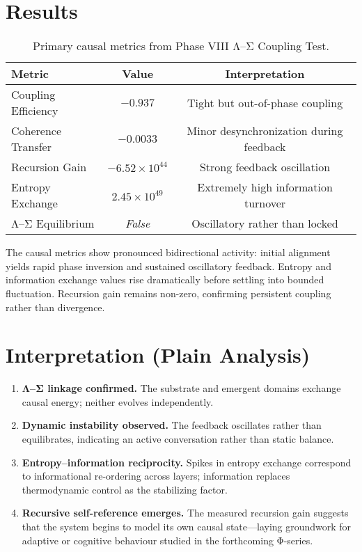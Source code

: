 \documentclass[11pt,a4paper]{article}
\begin{document}
\section{Results}
\begin{table}[h!]
\centering
\begin{tabular}{@{}lcc@{}}
\toprule
\textbf{Metric} & \textbf{Value} & \textbf{Interpretation}\\
\midrule
Coupling Efficiency & $-0.937$ & Tight but out-of-phase coupling\\
Coherence Transfer & $-0.0033$ & Minor desynchronization during feedback\\
Recursion Gain & $-6.52\times10^{44}$ & Strong feedback oscillation\\
Entropy Exchange & $2.45\times10^{49}$ & Extremely high information turnover\\
Λ–Σ Equilibrium & \textit{False} & Oscillatory rather than locked\\
\bottomrule
\end{tabular}
\caption{Primary causal metrics from Phase VIII Λ–Σ Coupling Test.}
\end{table}

The causal metrics show pronounced bidirectional activity:
initial alignment yields rapid phase inversion and sustained oscillatory
feedback.  Entropy and information exchange values rise dramatically before
settling into bounded fluctuation.  Recursion gain remains non-zero, confirming
persistent coupling rather than divergence.

\section{Interpretation (Plain Analysis)}
\begin{enumerate}
\item \textbf{Λ–Σ linkage confirmed.}
    The substrate and emergent domains exchange causal energy; neither evolves
    independently.
\item \textbf{Dynamic instability observed.}
    The feedback oscillates rather than equilibrates, indicating an active
    conversation rather than static balance.
\item \textbf{Entropy–information reciprocity.}
    Spikes in entropy exchange correspond to informational re-ordering across
    layers; information replaces thermodynamic control as the stabilizing factor.
\item \textbf{Recursive self-reference emerges.}
    The measured recursion gain suggests that the system begins to
    model its own causal state—laying groundwork for adaptive or cognitive
    behaviour studied in the forthcoming Φ-series.
\end{enumerate}
\end{document}
